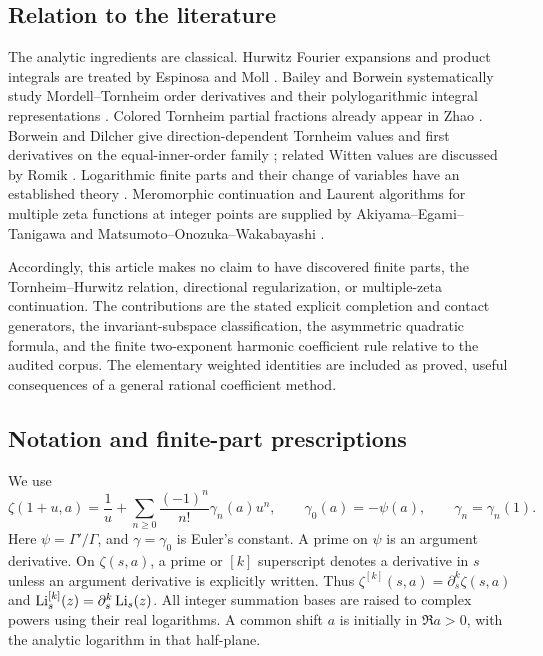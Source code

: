 \subsection{Relation to the literature}

The analytic ingredients are classical. Hurwitz Fourier expansions
and product integrals are treated by Espinosa and Moll
\cite{EM2002,EM2006}. Bailey and Borwein systematically study
Mordell--Tornheim order derivatives and their polylogarithmic integral
representations \cite{BB2014}. Colored Tornheim partial fractions already appear
in Zhao \cite{sp:Zhao}. Borwein and Dilcher give direction-dependent
Tornheim values and first derivatives on the equal-inner-order family
\cite{BorweinDilcher}; related Witten values are discussed by Romik
\cite{sp:Romik}. Logarithmic finite parts and their change of variables
have an established theory \cite{Latt2011}. Meromorphic continuation
and Laurent algorithms for multiple zeta functions at integer points
are supplied by Akiyama--Egami--Tanigawa and
Matsumoto--Onozuka--Wakabayashi \cite{h2:AET,h2:MOW}.

Accordingly, this article makes no claim to have discovered finite
parts, the Tornheim--Hurwitz relation, directional regularization, or
multiple-zeta continuation. The contributions are the stated explicit
completion and contact generators, the invariant-subspace
classification, the asymmetric quadratic formula, and the finite
two-exponent harmonic coefficient rule relative to the audited corpus.
The elementary weighted identities are included as proved, useful
consequences of a general rational coefficient method.

\subsection{Notation and finite-part prescriptions}

We use
\begin{equation}\label{scope:stieltjes}
 \zeta(1+u,a)=\frac1u+
       \sum_{n\ge0}\frac{(-1)^n}{n!}\gamma_n(a)u^n,
 \qquad \gamma_0(a)=-\psi(a),
 \qquad \gamma_n=\gamma_n(1).
\end{equation}
Here $\psi=\Gamma'/\Gamma$, and $\gamma=\gamma_0$ is Euler's
constant. A prime on $\psi$ is an argument derivative. On $\zeta(s,a)$,
a prime or $[k]$ superscript denotes a derivative in $s$ unless an
argument derivative is explicitly written. Thus
$\zeta^{[k]}(s,a)=\partial_s^k\zeta(s,a)$ and
$\operatorname{Li}_s^{[k]}(z)=\partial_s^k\operatorname{Li}_s(z)$.
All integer summation bases are raised to complex powers using their
real logarithms. A common shift $a$ is initially in $\Re a>0$, with the
analytic logarithm in that half-plane.

